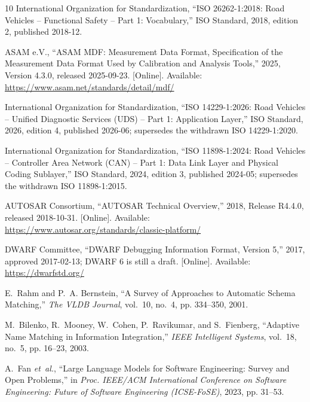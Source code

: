\documentclass[conference]{IEEEtran}
\begin{document}
\begin{thebibliography}{10}
{International Organization for Standardization}, ``{ISO 26262-1:2018: Road
  Vehicles -- Functional Safety -- Part 1: Vocabulary},'' ISO Standard, 2018,
  edition 2, published 2018-12.

\BIBentryALTinterwordspacing
{ASAM e.V.}, ``{ASAM MDF: Measurement Data Format, Specification of the
  Measurement Data Format Used by Calibration and Analysis Tools},'' 2025,
  {Version} 4.3.0, released 2025-09-23. [Online]. Available:
  \url{https://www.asam.net/standards/detail/mdf/}
\BIBentrySTDinterwordspacing

{International Organization for Standardization}, ``{ISO 14229-1:2026: Road
  Vehicles -- Unified Diagnostic Services (UDS) -- Part 1: Application
  Layer},'' ISO Standard, 2026, edition 4, published 2026-06; supersedes the
  withdrawn ISO 14229-1:2020.

{International Organization for Standardization}, ``{ISO 11898-1:2024: Road
  Vehicles -- Controller Area Network (CAN) -- Part 1: Data Link Layer and
  Physical Coding Sublayer},'' ISO Standard, 2024, edition 3, published
  2024-05; supersedes the withdrawn ISO 11898-1:2015.

\BIBentryALTinterwordspacing
{AUTOSAR Consortium}, ``{AUTOSAR Technical Overview},'' 2018, {Release}
  R4.4.0, released 2018-10-31. [Online]. Available:
  \url{https://www.autosar.org/standards/classic-platform/}
\BIBentrySTDinterwordspacing

\BIBentryALTinterwordspacing
{DWARF Committee}, ``{DWARF Debugging Information Format, Version 5},'' 2017,
  approved 2017-02-13; DWARF 6 is still a draft. [Online]. Available:
  \url{https://dwarfstd.org/}
\BIBentrySTDinterwordspacing

E.~Rahm and P.~A. Bernstein, ``{A Survey of Approaches to Automatic Schema
  Matching},'' \emph{The VLDB Journal}, vol.~10, no.~4, pp. 334--350, 2001.

M.~Bilenko, R.~Mooney, W.~Cohen, P.~Ravikumar, and S.~Fienberg, ``{Adaptive
  Name Matching in Information Integration},'' \emph{IEEE Intelligent
  Systems}, vol.~18, no.~5, pp. 16--23, 2003.

A.~Fan \emph{et~al.}, ``{Large Language Models for Software Engineering:
  Survey and Open Problems},'' in \emph{Proc. IEEE/ACM International
  Conference on Software Engineering: Future of Software Engineering
  (ICSE-FoSE)}, 2023, pp. 31--53.


\end{thebibliography}
\end{document}
